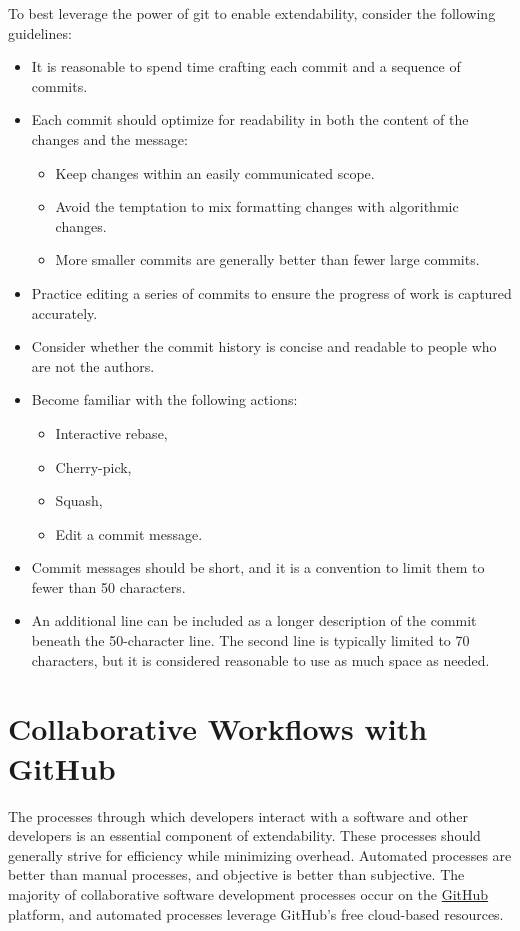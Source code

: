 \documentclass[]{nrel}
\begin{document}
To best leverage the power of git to enable extendability, consider the following guidelines:
\begin{itemize}
\item It is reasonable to spend time crafting each commit and a sequence of commits.
\item Each commit should optimize for readability in both the content of the changes and the message:
\begin{itemize}
    \item Keep changes within an easily communicated scope.
    \item Avoid the temptation to mix formatting changes with algorithmic changes.
    \item More smaller commits are generally better than fewer large commits.
\end{itemize}
\item Practice editing a series of commits to ensure the progress of work is captured accurately.
\item Consider whether the commit history is concise and readable to people who are not the authors.
\item Become familiar with the following actions:
\begin{itemize}
    \item Interactive rebase,
    \item Cherry-pick,
    \item Squash,
    \item Edit a commit message.
\end{itemize}
\item Commit messages should be short, and it is a convention to limit them to fewer than 50 characters.
\item An additional line can be included as a longer description of the commit beneath the
50-character line. The second line is typically limited to 70 characters, but it is
considered reasonable to use as much space as needed.

\end{itemize}


\section{Collaborative Workflows with GitHub}
\label{sec:github}

The processes through which developers interact with a software and other developers is
an essential component of extendability.
These processes should generally strive for efficiency while minimizing overhead.
Automated processes are better than manual processes, and objective is better than subjective.
The majority of collaborative software development processes occur on the
\href{https://github.com}{GitHub} platform, and automated processes leverage GitHub's free
cloud-based resources.
\end{document}
